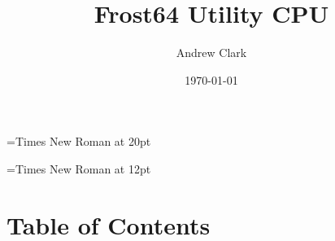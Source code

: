\documentclass{article}
\begin{document}
	\font\titlefont={Times New Roman} at 20pt
	\title{{\titlefont Frost64 Utility CPU}}

	\font\bottomtextfont={Times New Roman} at 12pt
	\date{{\bottomtextfont} \today}
	\author{{\bottomtextfont Andrew Clark}}

	\setmainfont{Times New Roman}
	\setmonofont{Courier New}

	\maketitle

	\newpage



\section{Table of Contents}
	\tableofcontents
	\newpage
\end{document}
